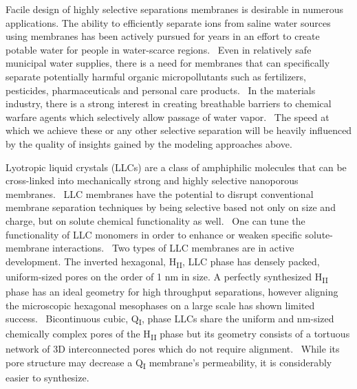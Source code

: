 \documentclass{article}
\begin{document}
  Facile design of highly selective separations membranes is desirable in numerous
  applications. The ability to efficiently separate ions from saline water sources using 
  membranes has been actively pursued for years in an effort to create potable water for 
  people in water-scarce regions.~\cite{werber_materials_2016} Even in relatively safe
  municipal water supplies, there is a need for membranes that can specifically separate
  potentially harmful organic micropollutants such as fertilizers, pesticides, pharmaceuticals
  and personal care products.~\cite{barbosa_occurrence_2016} In the materials industry,
  there is a strong interest in creating breathable barriers to chemical warfare agents
  which selectively allow passage of water vapor.~\cite{mondloch_destruction_2015}
  The speed at which we achieve these or any other selective separation will be 
  heavily influenced by the quality of insights gained by the modeling approaches above.

  Lyotropic liquid crystals (LLCs) are a class of amphiphilic molecules that can be 
  cross-linked into mechanically strong and highly selective nanoporous membranes.~\cite{gin_polymerized_2008}
  LLC membranes have the potential to disrupt conventional membrane separation techniques by 
  being selective based not only on size and charge, but on solute chemical functionality
  as well.~\cite{dischinger_application_2017} One can tune the functionality of LLC monomers
  in order to enhance or weaken specific solute-membrane interactions.~\cite{dischinger_effect_2017}
  Two types of LLC membranes are in active development. The inverted hexagonal, 
  H\textsubscript{II}, LLC phase has densely packed, uniform-sized pores on the order of 1 nm
  in size. A perfectly synthesized H\textsubscript{II} phase has an ideal geometry for high
  throughput separations, however aligning the microscopic hexagonal mesophases on a large 
  scale has shown limited success.~\cite{feng_scalable_2014,feng_thin_2016} Bicontinuous cubic,
  Q\textsubscript{I}, phase LLCs share the uniform and nm-sized chemically complex pores of
  the H\textsubscript{II} phase but its geometry consists of a tortuous network of 3D 
  interconnected pores which do not require alignment.~\cite{carter_glycerol-based_2012} While 
  its pore structure may decrease a Q\textsubscript{I} membrane's permeability, it is considerably
  easier to synthesize.
  
\end{document}
